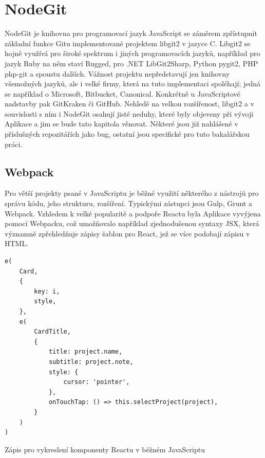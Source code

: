 \chapter{NodeGit}

NodeGit je knihovna pro programovací jazyk JavaScript se záměrem zpřístupnit základní funkce Gitu implementované projektem libgit2 v jazyce C. Libgit2 se hojně využívá pro široké spektrum i jiných programovacích jazyků, například pro jazyk Ruby na něm staví Rugged, pro .NET LibGit2Sharp, Python pygit2, PHP php-git a spoustu dalších. Vážnost projektu nepředstavují jen knihovny všemožných jazyků, ale i velké firmy, která na tuto implementaci spoléhají; jedná se například o Microsoft, Bitbucket, Canonical. Konkrétně u JavaScriptové nadstavby pak GitKraken či GitHub. Nehledě na velkou rozšířenost, libgit2 a v souvislosti s ním i NodeGit osahují jisté neduhy, které byly objeveny při vývoji Aplikace a jim se bude tato kapitola věnovat. Některé jsou již nahlášené v příslušných repozitářích jako bug, ostatní jsou specifické pro tuto bakalářskou práci.

\section{Webpack}

Pro větší projekty psané v JavaScriptu je běžné využití některého z nástrojů pro správu kódu, jeho strukturu, rozšíření. Typickými zástupci jsou Gulp, Grunt a Webpack. Vzhledem k velké popularitě a podpoře Reactu byla Aplikace vyvýjena pomocí Webpacku, což umožňovalo například zjednodušenou syntaxy JSX, která významně zpřehledňuje zápisy šablon pro React, jež se více podobají zápisu v HTML.

\begin{listing}[ht]
\begin{verbatim}
e(
	Card,
	{
		key: i,
		style,
	},
	e(
		CardTitle,
		{
			title: project.name,
			subtitle: project.note,
			style: {
				cursor: 'pointer',
			},
			onTouchTap: () => this.selectProject(project),
		}
	)
)
\end{verbatim}
\caption[Komponenta v JavaScriptu]{Zápis pro vykreslení komponenty Reactu v běžném JavaScriptu}
\end{listing}

